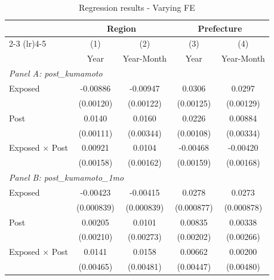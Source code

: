 \begin{table}[htbp]
\centering
\scriptsize
\setlength{\tabcolsep}{4pt}
\renewcommand{\arraystretch}{1.05}

\caption{Regression results - Varying FE}
\label{tab:regression}

\begin{tabular}{l*{4}{c}}
\toprule

& \multicolumn{2}{c}{Region}
& \multicolumn{2}{c}{Prefecture}
\\
\cmidrule(lr){2-3}
\cmidrule(lr){4-5}

& (1) & (2) & (3) & (4)\\
& Year & Year-Month & Year & Year-Month\\

\midrule


\multicolumn{5}{l}{\textit{Panel A: post\_kumamoto}}\\

Exposed
& -0.00886\sym{***}
& -0.00947\sym{***}
& 0.0306\sym{***}
& 0.0297\sym{***}
\\
& (0.00120)&(0.00122)&(0.00125)&(0.00129)
\\

Post
&0.0140\sym{***}
&0.0160\sym{***}
&0.0226\sym{***}
&0.00884\sym{***}
\\
&(0.00111)&(0.00344)&(0.00108)&(0.00334)
\\

Exposed $\times$ Post
&0.00921\sym{***}
&0.0104\sym{***}
&-0.00468\sym{***}
&-0.00420\sym{**}
\\
&(0.00158)&(0.00162)&(0.00159)&(0.00168)

\\[0.1cm]
\midrule


\multicolumn{5}{l}{\textit{Panel B: post\_kumamoto\_1mo}}\\

Exposed
&-0.00423\sym{***}
&-0.00415\sym{***}
&0.0278\sym{***}
&0.0273\sym{***}
\\
&(0.000839)&(0.000839)&(0.000877)&(0.000878)
\\

Post
&0.00205
&0.0101\sym{***}
&0.00835\sym{***}
&0.00338
\\
&(0.00210)&(0.00273)&(0.00202)&(0.00266)
\\

Exposed $\times$ Post
&0.0141\sym{***}
&0.0158\sym{***}
&0.00662
&0.00200
\\
&(0.00465)&(0.00481)&(0.00447)&(0.00480)


\end{tabular}
\end{table}
